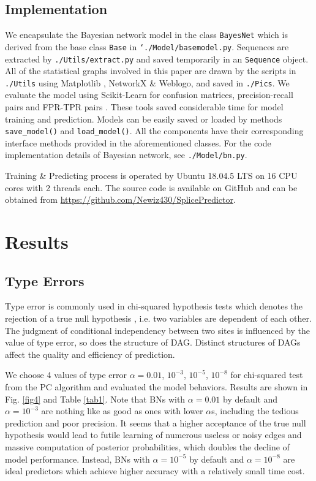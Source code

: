 \documentclass[journal,twoside]{IEEEtran}
\begin{document}
\subsection{Implementation}\label{3.4}

We encapsulate the Bayesian network model in the class \texttt{BayesNet} which is derived from the base class \texttt{Base} in \texttt{`./Model/basemodel.py}. Sequences are extracted by \texttt{./Utils/extract.py} and saved temporarily in an \texttt{Sequence} object. All of the statistical graphs involved in this paper are drawn by the scripts in \texttt{./Utils} using Matplotlib \cite{Hunter:2007}, NetworkX \cite{hagberg2008exploring} \& Weblogo, and saved in \texttt{./Pics}. We evaluate the model using Scikit-Learn for confusion matrices, precision-recall pairs and FPR-TPR pairs \cite{pedregosa2011scikit}. These tools saved considerable time for model training and prediction. Models can be easily saved or loaded by methods \texttt{save\_model()} and \texttt{load\_model()}. All the components have their corresponding interface methods provided in the aforementioned classes. For the code implementation details of Bayesian network, see \texttt{./Model/bn.py}. 

Training \& Predicting process is operated by Ubuntu 18.04.5 LTS on 16 CPU cores with 2 threads each. The source code is available on GitHub and can be obtained from \url{https://github.com/Newiz430/SplicePredictor}. 

\section{Results}\label{4}

\subsection{Type \uppercase\expandafter{} Errors}\label{4.1}

Type \uppercase\expandafter{} error is commonly used in chi-squared hypothesis tests which denotes the rejection of a true null hypothesis \cite{dekking2005modern}, i.e. two variables are dependent of each other. The judgment of conditional independency between two sites is influenced by the value of type \uppercase\expandafter{} error, so does the structure of DAG. Distinct structures of DAGs affect the quality and efficiency of prediction. 

We choose 4 values of type \uppercase\expandafter{} error $\alpha = 0.01$, $10^{-3}$, $10^{-5}$, $10^{-8}$ for chi-squared test from the PC algorithm and evaluated the model behaviors. Results are shown in Fig. \ref{fig4} and Table \ref{tab1}. Note that BNs with $\alpha=0.01$ by default and $\alpha=10^{-3}$ are nothing like as good as ones with lower $\alpha$s, including the tedious prediction and poor precision. It seems that a higher acceptance of the true null hypothesis would lead to futile learning of numerous useless or noisy edges and massive computation of posterior probabilities, which doubles the decline of model performance. Instead, BNs with $\alpha=10^{-5}$ by default and $\alpha=10^{-8}$ are ideal predictors which achieve higher accuracy with a relatively small time cost. 
\end{document}
